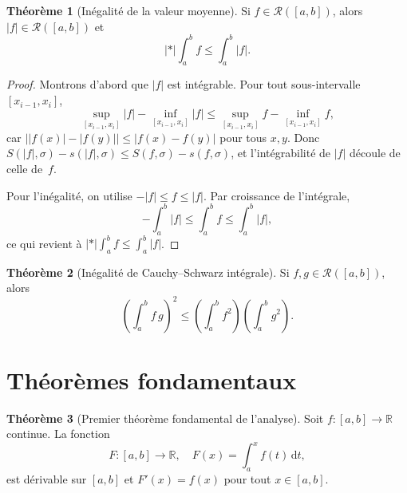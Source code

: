 \documentclass[12pt,a4paper,openany]{book}
\theoremstyle{definition}
\newtheorem{theoreme}{Théorème}[chapter]
\newcommand{\R}{\mathbb{R}}
\newcommand{\abs}[1]{\left\lvert #1 \right\rvert}
\newcommand{\dd}{\mathrm{d}}
\begin{document}
\begin{theoreme}[Inégalité de la valeur moyenne]\label{thm:ineg-valeur-moyenne}
  Si $f \in \mathcal{R}([a,b])$, alors $\abs{f} \in \mathcal{R}([a,b])$ et
  \[
    \abs*{\int_a^b f} \leqslant \int_a^b \abs{f}.
  \]
\end{theoreme}

\begin{proof}
  Montrons d'abord que $\abs{f}$ est intégrable. Pour tout sous-intervalle $[x_{i-1}, x_i]$,
  \[
    \sup_{[x_{i-1},x_i]} \abs{f} - \inf_{[x_{i-1},x_i]} \abs{f}
    \leqslant \sup_{[x_{i-1},x_i]} f - \inf_{[x_{i-1},x_i]} f,
  \]
  car $\bigl\lvert\abs{f(x)} - \abs{f(y)}\bigr\rvert \leqslant \abs{f(x) - f(y)}$ pour tous $x, y$. Donc $S(\abs{f},\sigma) - s(\abs{f},\sigma) \leqslant S(f,\sigma) - s(f,\sigma)$, et l'intégrabilité de $\abs{f}$ découle de celle de~$f$.

  Pour l'inégalité, on utilise $-\abs{f} \leqslant f \leqslant \abs{f}$. Par croissance de l'intégrale,
  \[
    -\int_a^b \abs{f} \leqslant \int_a^b f \leqslant \int_a^b \abs{f},
  \]
  ce qui revient à $\displaystyle\abs*{\int_a^b f} \leqslant \int_a^b \abs{f}$.
\end{proof}

\begin{theoreme}[Inégalité de Cauchy--Schwarz intégrale]\label{thm:cauchy-schwarz-integrale}
  Si $f, g \in \mathcal{R}([a,b])$, alors
  \[
    \left(\int_a^b f\, g\right)^2 \leqslant \left(\int_a^b f^2\right)\left(\int_a^b g^2\right).
  \]
\end{theoreme}

\section{Théorèmes fondamentaux}
\label{sec:theoremes-fondamentaux}

\begin{theoreme}[Premier théorème fondamental de l'analyse]\label{thm:premier-fondamental}
  Soit $f \colon [a,b] \to \R$ continue. La fonction
  \[
    F \colon [a,b] \to \R, \quad F(x) = \int_a^x f(t)\,\dd t,
  \]
  est dérivable sur $[a,b]$ et $F'(x) = f(x)$ pour tout $x \in [a,b]$.
\end{theoreme}
\end{document}
